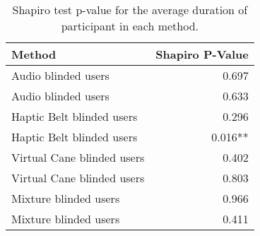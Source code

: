 
\begin{table}[!htb]
\centering
\caption{Shapiro test p-value for the average duration of participant in each method.}
\label{tab:shapiro_duration_avg}
\begin{tabular}{lr}
\toprule
                    Method & Shapiro P-Value \\
\midrule
       Audio blinded users &           0.697 \\
       Audio blinded users &           0.633 \\
 Haptic Belt blinded users &           0.296 \\
 Haptic Belt blinded users &         0.016** \\
Virtual Cane blinded users &           0.402 \\
Virtual Cane blinded users &           0.803 \\
     Mixture blinded users &           0.966 \\
     Mixture blinded users &           0.411 \\
\bottomrule
\end{tabular}
\end{table}


